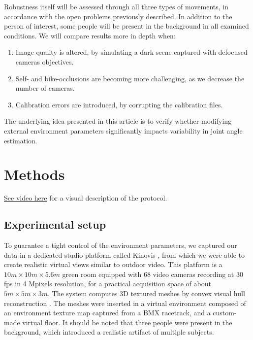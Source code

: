 Robustness itself will be assessed through all three types of movements, in accordance with the open problems previously described. In addition to the person of interest, some people will be present in the background in all examined conditions. We will compare results more in depth when:
\begin{enumerate}[itemsep=0em, topsep=0em]
      \item Image quality is altered, by simulating a dark scene captured with defocused cameras objectives.
      \item Self- and bike-occlusions are becoming more challenging, as we decrease the number of cameras.
      \item Calibration errors are introduced, by corrupting the calibration files.
\end{enumerate}

The underlying idea presented in this article is to verify whether modifying external environment parameters significantly impacts variability in joint angle estimation.

\newpage
\section{Methods}

\href{https://github.com/davidpagnon/These_David_Pagnon/blob/main/Thesis/Chap4/Figures/Vid_Protocol.mp4?raw=true}{See video here} for a visual description of the protocol.

\subsection{Experimental setup}

To guarantee a tight control of the environment parameters, we captured our data in a dedicated studio platform called Kinovis \cite{Tsiminaki2014}, from which we were able to create realistic virtual views similar to outdoor video. This platform is a \(10 m \times 10 m \times 5.6 m\) green room equipped with 68 video cameras recording at 30 fps in 4 Mpixels resolution, for a practical acquisition space of about \(5 m  \times 5 m  \times 3 m\). The system computes 3D textured meshes by convex visual hull reconstruction \cite{Laurentini1994}. The meshes were inserted in a virtual environment composed of an environment texture map captured from a BMX racetrack, and a custom-made virtual floor. It should be noted that three people were present in the background, which introduced a realistic artifact of multiple subjects.


